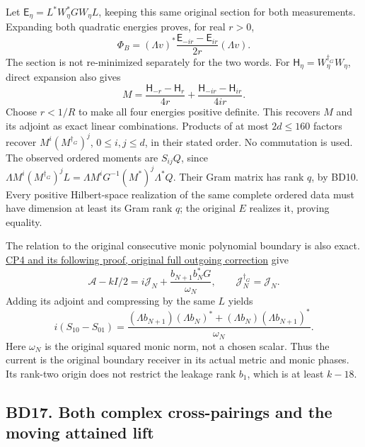 \documentclass[11pt]{article}
\begin{document}
Let \(\mathsf E_\eta=L^*W_\eta^*GW_\eta L\), keeping this same original section for both measurements. Expanding both quadratic energies proves, for real \(r>0\), \[
\Phi_B=(\Lambda v)^*\frac{\mathsf E_{-ir}-\mathsf E_{ir}}{2r}(\Lambda v). \tag{BD30}
\] The section is not re-minimized separately for the two words. For \(\mathsf H_\eta=W_\eta^{\dagger_G}W_\eta\), direct expansion also gives \[
M=\frac{\mathsf H_{-r}-\mathsf H_r}{4r}
+\frac{\mathsf H_{-ir}-\mathsf H_{ir}}{4ir}.
\] Choose \(r<1/R\) to make all four energies positive definite. This recovers \(M\) and its adjoint as exact linear combinations. Products of at most \(2d\le160\) factors recover \(M^i(M^{\dagger_G})^j\), \(0\le i,j\le d\), in their stated order. No commutation is used. The observed ordered moments are \(S_{ij}Q\), since \(\Lambda M^i(M^{\dagger_G})^jL=\Lambda M^iG^{-1}(M^*)^j\Lambda^*Q\). Their Gram matrix has rank \(q\), by BD10. Every positive Hilbert-space realization of the same complete ordered data must have dimension at least its Gram rank \(q\); the original \(E\) realizes it, proving equality.

The relation to the original consecutive monic polynomial boundary is also exact. \href{https://github.com/KokunoYumeto/zeta-function-research-reader/blob/13ca9b136fcdae48df7454bd9bf99e1ef22dd03c/workbenches/splitzero-tandem/continuations/20260922-original-growth-resolvent/RETAINED_COMPLETE_PROOF_SOURCES.tex\#L281793}{CP4 and its following proof, original full outgoing correction} give \[
\mathscr A-kI/2=i\mathcal J_N+\frac{b_{N+1}b_N^*G}{\omega_N},\qquad
\mathcal J_N^{\dagger_G}=\mathcal J_N.
\] Adding its adjoint and compressing by the same \(L\) yields \[
i(S_{10}-S_{01})=
\frac{(\Lambda b_{N+1})(\Lambda b_N)^*+(\Lambda b_N)(\Lambda b_{N+1})^*}{\omega_N}.
\] Here \(\omega_N\) is the original squared monic norm, not a chosen scalar. Thus the current is the original boundary receiver in its actual metric and monic phases. Its rank-two origin does not restrict the leakage rank \(b_1\), which is at least \(k-18\).

\subsection{BD17. Both complex cross-pairings and the moving attained lift}\label{bd17.-both-complex-cross-pairings-and-the-moving-attained-lift}
\end{document}

